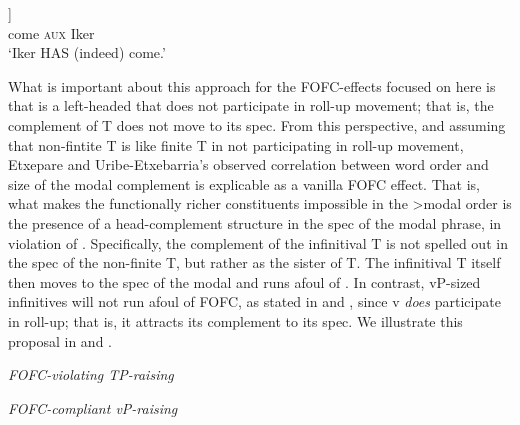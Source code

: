 \documentclass[output=paper]{langscibook}
\begin{document}
\ea \label{ex:haddican:38}
    \gll [\textsubscript{\textit{FocP}} [\textsubscript{\textit{PolP}} \textit{Etorri}] [\textsubscript{\textit{TP}} \textit{da} \textit{Iker.}]] \\
	{} {} come {} \textsc{aux} Iker\\
    \glt `Iker HAS (indeed) come.' \protect\label{iker}
\z

What is important about this approach for the FOFC-effects focused on here is that  is a left-headed  that does not participate in roll-up movement; that is, the complement of T does not move to its spec.  From this perspective, and assuming that non-fintite T is like finite T in not participating in roll-up movement, Etxepare and Uribe-Etxebarria's observed correlation between word order and size of the modal complement is explicable as a vanilla FOFC effect.  That is, what makes the functionally richer constituents impossible in the >modal order is the presence of a head-complement structure in the spec of the modal phrase, in violation of \protect{}.  Specifically, the complement of the infinitival T is not spelled out in the spec of the non-finite T, but rather as the sister of T.  The infinitival T itself then moves to the spec of the modal  and runs afoul of \protect{}. In contrast, vP-sized infinitives will not run afoul of FOFC, as stated in \protect{} and \protect{}, since v \textit{does} participate in roll-up; that is, it attracts its complement to its spec. We illustrate this proposal in  and .


\ea \label{ex:haddican:39} \textit{FOFC-violating TP-raising} \protect\label{tree-8} \\  \samepage
{}
\z 

\ea \label{ex:haddican:40}  \textit{FOFC-compliant vP-raising} \protect\label{tree-9} \\  \samepage
{}
\z
\end{document}
